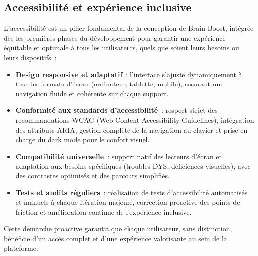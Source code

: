 \documentclass[a4paper,11pt]{report}
\begin{document}
\subsection{Accessibilité et expérience inclusive}
L'accessibilité est un pilier fondamental de la conception de Brain Boost, intégrée dès les premières phases du développement pour garantir une expérience équitable et optimale à tous les utilisateurs, quels que soient leurs besoins ou leurs dispositifs :
\begin{itemize}
    \item \textbf{Design responsive et adaptatif} : l'interface s'ajuste dynamiquement à tous les formats d'écran (ordinateur, tablette, mobile), assurant une navigation fluide et cohérente sur chaque support.
    \item \textbf{Conformité aux standards d'accessibilité} : respect strict des recommandations WCAG (Web Content Accessibility Guidelines), intégration des attributs ARIA, gestion complète de la navigation au clavier et prise en charge du dark mode pour le confort visuel.
    \item \textbf{Compatibilité universelle} : support natif des lecteurs d'écran et adaptation aux besoins spécifiques (troubles DYS, déficiences visuelles), avec des contrastes optimisés et des parcours simplifiés.
    \item \textbf{Tests et audits réguliers} : réalisation de tests d'accessibilité automatisés et manuels à chaque itération majeure, correction proactive des points de friction et amélioration continue de l'expérience inclusive.
\end{itemize}
Cette démarche proactive garantit que chaque utilisateur, sans distinction, bénéficie d'un accès complet et d'une expérience valorisante au sein de la plateforme.
\end{document}
